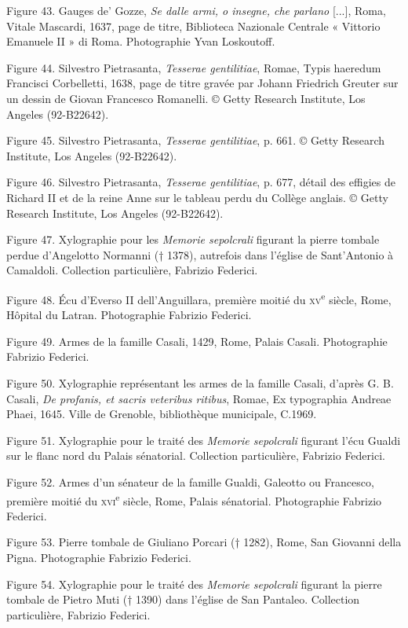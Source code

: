 \documentclass[12pt,twoside,openany]{book}
\begin{document}
Figure 43. Gauges de’ Gozze, \textit{Se dalle armi, o insegne, che parlano }[...], Roma, Vitale Mascardi, 1637, page de titre, Biblioteca Nazionale Centrale « Vittorio Emanuele II » di Roma. Photographie Yvan Loskoutoff.

Figure 44. Silvestro Pietrasanta, \textit{Tesserae gentilitiae}, Romae, Typis haeredum Francisci Corbelletti, 1638, page de titre gravée par Johann Friedrich Greuter sur un dessin de Giovan Francesco Romanelli. © Getty Research Institute, Los Angeles (92-B22642).

Figure 45. Silvestro Pietrasanta, \textit{Tesserae gentilitiae}, p. 661. © Getty Research Institute, Los Angeles (92-B22642).

Figure 46. Silvestro Pietrasanta, \textit{Tesserae gentilitiae}, p. 677, détail des effigies de Richard II et de la reine Anne sur le tableau perdu du Collège anglais. © Getty Research Institute, Los Angeles (92-B22642).

Figure 47. Xylographie pour les \textit{Memorie sepolcrali} figurant la pierre tombale perdue d’Angelotto Normanni († 1378), autrefois dans l’église de Sant’Antonio à Camaldoli. Collection particulière, Fabrizio Federici.

Figure 48. Écu d’Everso II dell’Anguillara, première moitié du \textsc{xv}\textsuperscript{e} siècle, Rome, Hôpital du Latran. Photographie Fabrizio Federici.

Figure 49. Armes de la famille Casali, 1429, Rome, Palais Casali. Photographie Fabrizio Federici.

Figure 50. Xylographie représentant les armes de la famille Casali, d’après G. B. Casali, \textit{De profanis, et sacris veteribus ritibus}, Romae, Ex typographia Andreae Phaei, 1645. Ville de Grenoble, bibliothèque municipale, C.1969.

Figure 51. Xylographie pour le traité des \textit{Memorie sepolcrali} figurant l’écu Gualdi sur le flanc nord du Palais sénatorial. Collection particulière, Fabrizio Federici.

Figure 52. Armes d’un sénateur de la famille Gualdi, Galeotto ou Francesco, première moitié du \textsc{xvi}\textsuperscript{e} siècle, Rome, Palais sénatorial. Photographie Fabrizio Federici.

Figure 53. Pierre tombale de Giuliano Porcari († 1282), Rome, San Giovanni della Pigna. Photographie Fabrizio Federici.

Figure 54. Xylographie pour le traité des \textit{Memorie sepolcrali} figurant la pierre tombale de Pietro Muti († 1390) dans l’église de San Pantaleo. Collection particulière, Fabrizio Federici.
\end{document}
